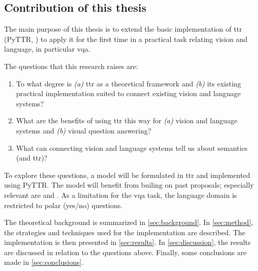 \subsection{Contribution of this thesis}
\label{sec:contribution}

The main purpose of this thesis is to extend the basic implementation of \gls{ttr} (PyTTR, \cite{pyttr}) to apply it for the first time in a practical task relating vision and language, in particular \gls{vqa}.

The questions that this research raises are:

\begin{enumerate}
\item To what degree is \textit{(a)} \gls{ttr} as a theoretical framework and \textit{(b)} its existing practical implementation suited to connect existing vision and language systems?
\item What are the benefits of using \gls{ttr} this way for \textit{(a)} vision and language systems and \textit{(b)} visual question answering?
\item What can connecting vision and language systems tell us about semantics (and \gls{ttr})?
\end{enumerate}

To explore these questions, a model will be formulated in \gls{ttr} and implemented using PyTTR.
The model will benefit from builing on past proposals; especially relevant are \cite{ttrspat} and \cite{lspc}.
As a limitation for the \gls{vqa} task, the language domain is restricted to polar (yes/no) questions.


The theoretical background is summarized in \autoref{sec:background}.
In \autoref{sec:method}, the strategies and techniques used for the implementation are described.
The implementation is then presented in \autoref{sec:results}.
In \autoref{sec:discussion}, the results are discussed in relation to the questions above.
Finally, some conclusions are made in \autoref{sec:conclusions}.
